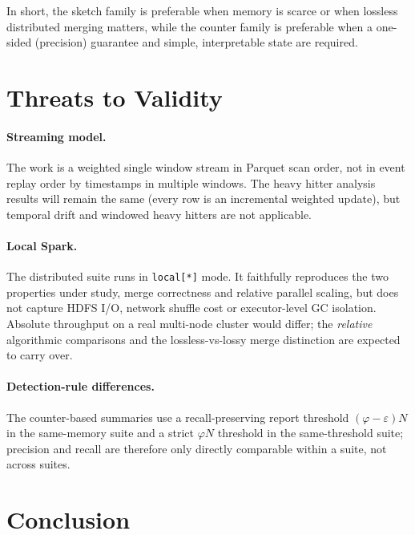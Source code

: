 \documentclass[12pt]{article}
\begin{document}
In short, the sketch family is preferable when memory is scarce or when lossless
distributed merging matters, while the counter family is preferable when a
one-sided (precision) guarantee and simple, interpretable state are required.

\section{Threats to Validity}
\label{sec:threats}

\paragraph{Streaming model.} The work is a weighted single window stream in
Parquet scan order, not in event replay order by timestamps in multiple windows.
The heavy hitter analysis results will remain the same (every row is an incremental weighted update), but temporal drift and windowed heavy hitters are not applicable.

\paragraph{Local Spark.} The distributed suite runs in \texttt{local[*]} mode.
It faithfully reproduces the two properties under study, merge correctness and
relative parallel scaling, but does not capture HDFS I/O, network shuffle cost
or executor-level GC isolation. Absolute throughput on a real multi-node cluster
would differ; the \emph{relative} algorithmic comparisons and the
lossless-vs-lossy merge distinction are expected to carry over.

\paragraph{Detection-rule differences.} The counter-based summaries use a
recall-preserving report threshold $(\varphi-\varepsilon)N$ in the same-memory
suite and a strict $\varphi N$ threshold in the same-threshold suite; precision
and recall are therefore only directly comparable within a suite, not across
suites.

\section{Conclusion}
\label{sec:conclusion}
\end{document}
